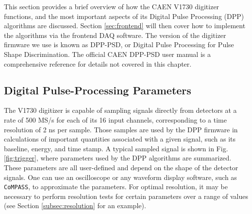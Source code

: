 This section provides a brief overview of how the CAEN V1730 digitizer functions, and the most important aspects of its Digital Pulse Processing (DPP) algorithms are discussed. Section \ref{sec:frontend} will then cover how to implement the algorithms via the frontend DAQ software. The version of the digitizer firmware we use is known as DPP-PSD, or Digital Pulse Processing for Pulse Shape Discrimination. The official CAEN DPP-PSD user manual is a comprehensive reference for details not covered in this chapter. 


\subsection{Digital Pulse-Processing Parameters} \label{subsec:DPP}

The V1730 digitizer is capable of sampling signals directly from detectors at a rate of 500 MS/s for each of its 16 input channels, corresponding to a time resolution of 2 ns per sample. Those samples are used by the DPP firmware in calculations of important quantities associated with a given signal, such as its baseline, energy, and time stamp. A typical sampled signal is shown in Fig. \ref{fig:trigger}, where parameters used by the DPP algorithms are summarized. These parameters are all user-defined and depend on the shape of the detector signals. One can use an oscilloscope or any waveform display software, such as \texttt{CoMPASS}, to approximate the parameters. For optimal resolution, it may be necessary to perform resolution tests for certain parameters over a range of values (see Section \ref{subsec:resolution} for an example).


